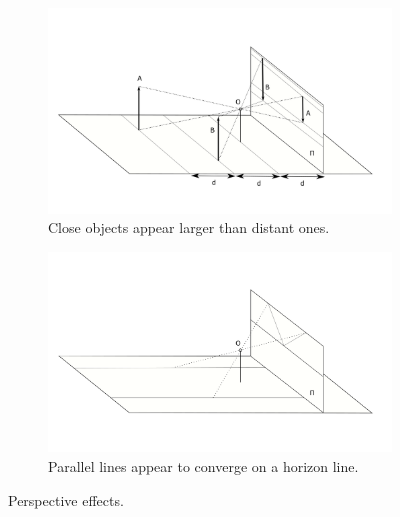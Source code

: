 \begin{figure}[H]
    \begin{subfigure}{\textwidth}
        \includegraphics[width=\linewidth]{perspective.png}
        \caption{Close objects appear larger than distant ones.}
        \label{fig:perspective1}
    \end{subfigure}
    \begin{subfigure}{\textwidth}
        \includegraphics[width=\linewidth]{perspective2.png}
        \caption{Parallel lines appear to converge on a horizon line.}
        \label{fig:perspective2}
    \end{subfigure}
    \caption{Perspective effects.}
    \label{fig:perspective}
\end{figure}
